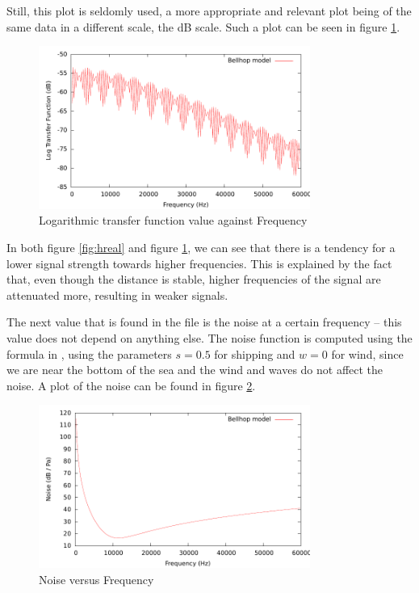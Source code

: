 \documentclass[a4paper]{IEEEtran}
\begin{document}
Still, this plot is seldomly used, a more appropriate and relevant
plot being of the same data in a different scale, the dB scale. Such a
plot can be seen in figure \ref{fig:logh}.

\begin{figure}[ht]
  \centering
  \includegraphics[width=3.5in]{../postprocessing/logh00.pdf}
  \caption{\small{Logarithmic transfer function value against
      Frequency}}
  \label{fig:logh}
\end{figure}

In both figure \ref{fig:hreal} and figure \ref{fig:logh}, we can see
that there is a tendency for a lower signal strength towards higher
frequencies. This is explained by the fact that, even though the
distance is stable, higher frequencies of the signal are attenuated
more, resulting in weaker signals.

The next value that is found in the file is the noise at a certain
frequency -- this value does not depend on anything else. The noise
function is computed using the formula in \cite{stojanovic}, using the
parameters $s = 0.5$ for shipping and $w = 0$ for wind, since we are
near the bottom of the sea and the wind and waves do not affect the
noise. A plot of the noise can be found in figure \ref{fig:noise}.

\begin{figure}[ht]
  \centering
  \includegraphics[width=3.5in]{../postprocessing/noise00.pdf}
  \caption{\small{Noise versus Frequency}}
  \label{fig:noise}
\end{figure}
\end{document}
